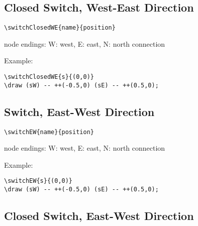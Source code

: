 \documentclass[parskip=full]{scrartcl}
\begin{document}
\subsection{Closed Switch, West-East Direction}

\begin{verbatim}
\switchClosedWE{name}{position}
\end{verbatim}
node endings: W: west, E: east, N: north connection

Example:\\
\begin{minipage}{0.8\textwidth}
\begin{verbatim}
\switchClosedWE{s}{(0,0)}
\draw (sW) -- ++(-0.5,0) (sE) -- ++(0.5,0);
\end{verbatim}
\end{minipage}
\begin{minipage}{0.19\textwidth}
\end{minipage}

\subsection{Switch, East-West Direction}

\begin{verbatim}
\switchEW{name}{position}
\end{verbatim}
node endings: W: west, E: east, N: north connection

Example:\\
\begin{minipage}{0.8\textwidth}
\begin{verbatim}
\switchEW{s}{(0,0)}
\draw (sW) -- ++(-0.5,0) (sE) -- ++(0.5,0);
\end{verbatim}
\end{minipage}
\begin{minipage}{0.19\textwidth}
\end{minipage}

\subsection{Closed Switch, East-West Direction}
\end{document}
